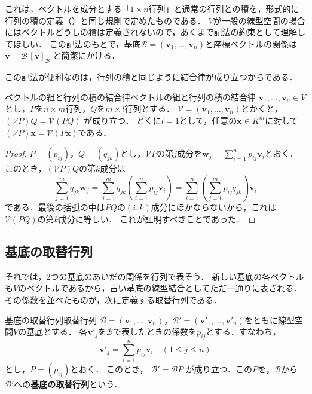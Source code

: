 \begin{remark}[形式的な行列記法について]
  これは，ベクトルを成分とする「$1 \times n$行列」と通常の行列との積を，形式的に行列の積の定義（）と同じ規則で定めたものである．
  $V$が一般の線型空間の場合にはベクトルどうしの積は定義されないので，あくまで記法の約束として理解してほしい．
  この記法のもとで，基底$\mathcal{B} = (\bm{v}_1, \dots, \bm{v}_n)$と座標ベクトルの関係は
  $\bm{v} = \mathcal{B} \, [\bm{v}]_{\mathcal{B}}$
  と簡潔にかける．
\end{remark}

この記法が便利なのは，行列の積と同じように結合律が成り立つからである．

\begin{prop}{ベクトルの組と行列の積の結合律}{ベクトルの組と行列の積の結合律}
  $\bm{v}_1, \dots, \bm{v}_n \in V$とし，$P$を$n \times m$行列，$Q$を$m \times l$行列とする．
  $\mathcal{V} = (\bm{v}_1, \dots, \bm{v}_n)$とかくと，
  $(\mathcal{V} P) Q = \mathcal{V} (PQ)$
  が成り立つ．
  とくに$l=1$として，任意の$\bm{x}\in K^m$に対して$(\mathcal{V}P)\bm{x}=\mathcal{V}(P\bm{x})$である．
\end{prop}

\begin{tleftbar}
\begin{proof}
  $P = (p_{ij})$，$Q = (q_{jk})$とし，$\mathcal{V}P$の第$j$成分を$\bm{w}_j = \sum_{i=1}^{n} p_{ij} \bm{v}_i$とおく．
  このとき，$(\mathcal{V}P)Q$の第$k$成分は
  \[
    \sum_{j=1}^{m} q_{jk} \bm{w}_j
    = \sum_{j=1}^{m} q_{jk} \left( \sum_{i=1}^{n} p_{ij} \bm{v}_i \right)
    = \sum_{i=1}^{n} \left( \sum_{j=1}^{m} p_{ij} q_{jk} \right) \bm{v}_i
  \]
  である．最後の括弧の中は$PQ$の$(i,k)$成分にほかならないから，これは$\mathcal{V}(PQ)$の第$k$成分に等しい．
  これが証明すべきことであった．
\end{proof}
\end{tleftbar}

\subsection{基底の取替行列}

それでは，$2$つの基底のあいだの関係を行列で表そう．
新しい基底の各ベクトルも$V$のベクトルであるから，古い基底の線型結合としてただ一通りに表される．
その係数を並べたものが，次に定義する取替行列である．

\begin{definition}{基底の取替行列}{取替行列}
  $\mathcal{B} = (\bm{v}_1, \dots, \bm{v}_n)$，$\mathcal{B}' = (\bm{v}'_1, \dots, \bm{v}'_n)$をともに線型空間$V$の基底とする．
  各$\bm{v}'_j$を$\mathcal{B}$で表したときの係数を$p_{ij}$とする．すなわち，
  \[
    \bm{v}'_j = \sum_{i=1}^{n} p_{ij} \bm{v}_i \quad (1 \le j \le n)
  \]
  とし，$P = (p_{ij})$とおく．
  このとき，
  $\mathcal{B}' = \mathcal{B} P$
  が成り立つ．この$P$を，$\mathcal{B}$から$\mathcal{B}'$への\textbf{基底の取替行列}という．
\end{definition}

